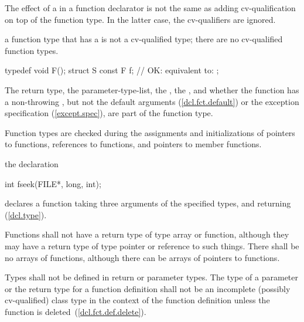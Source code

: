 \pnum
The effect of a
in a function declarator is not the same as
adding cv-qualification on top of the function type.
In the latter case, the cv-qualifiers are ignored.
\begin{note} a function type that has a  is not a
cv-qualified type; there are no cv-qualified function types. \end{note}
\begin{example}

\begin{codeblock}
typedef void F();
struct S {
  const F f;        // OK: equivalent to: 
};
\end{codeblock}
\end{example}

\pnum
The return type, the parameter-type-list, the ,
the , and
whether the function has a non-throwing ,
but not the default arguments (\ref{dcl.fct.default})
or the exception specification (\ref{except.spec}),
are part of the function type.
\begin{note}
Function types are checked during the assignments and initializations of
pointers to functions, references to functions, and pointers to member functions.
\end{note}

\pnum
\begin{example}
%
the declaration

\begin{codeblock}
int fseek(FILE*, long, int);
\end{codeblock}

declares a function taking three arguments of the specified types,
and returning
(\ref{dcl.type}).
\end{example}

\pnum
{}%
%
Functions shall not have a return type of type array or function,
although they may have a return type of type pointer or reference to such things.
There shall be no arrays of functions, although there can be arrays of pointers
to functions.

\pnum
Types shall not be defined in return or parameter types.
The type of a parameter or the return type for a function
definition shall not be an incomplete
(possibly cv-qualified) class type
in the context of the function definition
unless the function is
deleted~(\ref{dcl.fct.def.delete}).

